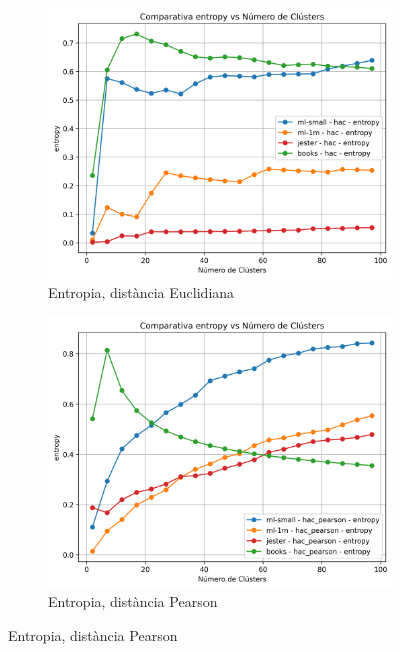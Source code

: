 \documentclass[a4paper,12pt]{report}
\begin{document}
\begin{figure}[H]
    \vspace{1em}

    \begin{subfigure}[b]{0.49\textwidth}
        \includegraphics[width=\textwidth]{Figuras/entropy-hac-all.png}
        \caption{Entropia, distància Euclidiana}
        \label{fig:hac-clustering-results-e}
    \end{subfigure}
    \hfill
    \begin{subfigure}[b]{0.49\textwidth}
        \includegraphics[width=\textwidth]{Figuras/entropy-hac_pearson-all.png}
        \caption{Entropia, distància Pearson}
        \label{fig:hac-clustering-results-f}
    \end{subfigure}


\end{figure}
\end{document}
